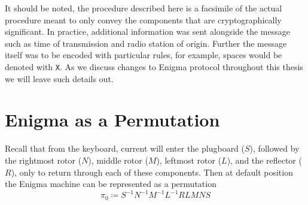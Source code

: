 \noindent It should be noted, the procedure described here is a
facsimile of the actual procedure meant to only convey the components
that are cryptographically significant. In practice, additional
information was sent alongside the message such as time of
transmission and radio station of origin. Further the message itself
was to be encoded with particular rules, for example, spaces would be
denoted with \texttt{X}. As we discuss changes to Enigma protocol
throughout this thesis we will leave such details out.


\section{Enigma as a Permutation}

Recall that from the keyboard, current will enter the plugboard
($S$), followed by the rightmost rotor ($N$), middle
rotor ($M$), leftmost rotor ($L$), and the reflector ($R$), only to
return through each of these components. Then at default position the
Enigma machine can be represented as a permutation
\[
  \pi_0 \coloneq S^{-1}N^{-1}M^{-1}L^{-1}RLMNS
\]

